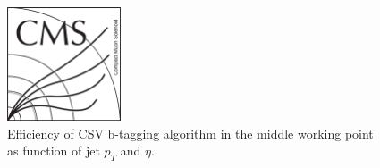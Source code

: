 \begin{figure}[!Hhtbp]
  \begin{center}
    \includegraphics[width=0.3\textwidth]{figs/CMSlogo.png}
    \caption{Efficiency of CSV b-tagging algorithm in the middle working point as function of jet $p_{T}$ and $\eta$.}
    \label{fig:CSVEff}
  \end{center}
\end{figure}

%
%
%
%
%
